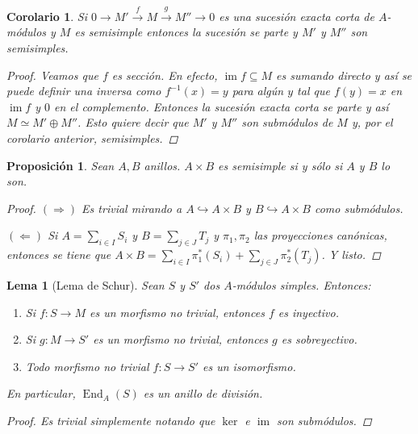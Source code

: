 \documentclass[12pt]{book}
\newtheorem{lem}[teo]{Lema}
\newtheorem{prop}[teo]{Proposición}
\newtheorem{cor}[teo]{Corolario}
\theoremstyle{definition}
\DeclareMathOperator{\im}{im}
\DeclareMathOperator{\End}{End}
\begin{document}
\begin{cor}
Si $0\longrightarrow M'\stackrel{f}{\longrightarrow} M\stackrel{g}{\longrightarrow}M''\longrightarrow 0$ es una sucesión exacta corta de $A$-módulos y $M$ es semisimple entonces la sucesión se parte y $M'$ y $M''$ son semisimples.
\begin{proof}
Veamos que $f$ es sección. En efecto, $\im f\subseteq M$ es sumando directo y así se puede definir una inversa como $f^{-1}(x) = y$ para algún $y$ tal que $f(y)=x$ en $\im f$ y $0$ en el complemento. Entonces la sucesión exacta corta se parte y así $M\simeq M' \oplus M''$. Esto quiere decir que $M'$ y $M''$ son submódulos de $M$ y, por el corolario anterior, semisimples.
\end{proof}
\end{cor}

\begin{prop}
Sean $A,B$ anillos. $A\times B$ es semisimple si y sólo si $A$ y $B$ lo son.
\begin{proof}
$(\Longrightarrow)$ Es trivial mirando a $A\hookrightarrow A\times B$ y $B\hookrightarrow A\times B$ como submódulos.

$(\Longleftarrow)$ Si $A=\displaystyle\sum_{i\in I}S_i$ y $B=\displaystyle\sum_{j\in J}T_j$ y $\pi_1,\pi_2$ las proyecciones canónicas, entonces se tiene que $A\times B = \displaystyle\sum_{i\in I}\pi_1^*(S_i) + \sum_{j\in J}\pi_2^*(T_j)$. Y listo.
\end{proof}
\end{prop}

\begin{lem}[Lema de Schur]
Sean $S$ y $S'$ dos $A$-módulos simples. Entonces: \begin{enumerate}\item Si $f:S\to M$ es un morfismo no trivial, entonces $f$ es inyectivo. \item Si $g:M\to S'$ es un morfismo no trivial, entonces $g$ es sobreyectivo. \item Todo morfismo no trivial $f:S\to S'$ es un isomorfismo.\end{enumerate} En particular, $\End_A(S)$ es un anillo de división.
\begin{proof}
Es trivial simplemente notando que $\ker$ e $\im$ son submódulos.
\end{proof}
\end{lem}
\end{document}
